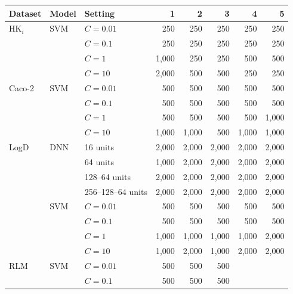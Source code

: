 \label{app:add:budget_by_capacity}
\begin{table}[htbp]
\centering
\begin{tabular}{@{}lllrrrrr@{}}
\toprule
Dataset & Model & Setting & 1 & 2 & 3 & 4 & 5 \\
\midrule
HK$_i$ & SVM & $C = 0.01$ & 250 & 250 & 250 & 250 & 250 \\
 &  & $C = 0.1$ & 250 & 250 & 250 & 250 & 250 \\
 &  & $C = 1$ & 1{,}000 & 250 & 250 & 500 & 500 \\
 &  & $C = 10$ & 2{,}000 & 500 & 500 & 250 & 250 \\
Caco-2 & SVM & $C = 0.01$ & 500 & 500 & 500 & 500 & 500 \\
 &  & $C = 0.1$ & 500 & 500 & 500 & 500 & 500 \\
 &  & $C = 1$ & 500 & 500 & 500 & 500 & 1{,}000 \\
 &  & $C = 10$ & 1{,}000 & 1{,}000 & 500 & 1{,}000 & 1{,}000 \\
LogD & DNN & 16 units & 2{,}000 & 2{,}000 & 2{,}000 & 2{,}000 & 2{,}000 \\
 &  & 64 units & 1{,}000 & 2{,}000 & 2{,}000 & 2{,}000 & 2{,}000 \\
 &  & 128--64 units & 2{,}000 & 2{,}000 & 2{,}000 & 2{,}000 & 2{,}000 \\
 &  & 256--128--64 units & 2{,}000 & 2{,}000 & 2{,}000 & 2{,}000 & 2{,}000 \\
 & SVM & $C = 0.01$ & 500 & 500 & 500 & 500 & 500 \\
 &  & $C = 0.1$ & 500 & 500 & 500 & 500 & 500 \\
 &  & $C = 1$ & 1{,}000 & 1{,}000 & 1{,}000 & 1{,}000 & 2{,}000 \\
 &  & $C = 10$ & 1{,}000 & 2{,}000 & 1{,}000 & 2{,}000 & 2{,}000 \\
RLM & SVM & $C = 0.01$ & 500 & 500 & 500 &  &  \\
 &  & $C = 0.1$ & 500 & 500 & 500 &  &  \\

\end{tabular}
\end{table}
